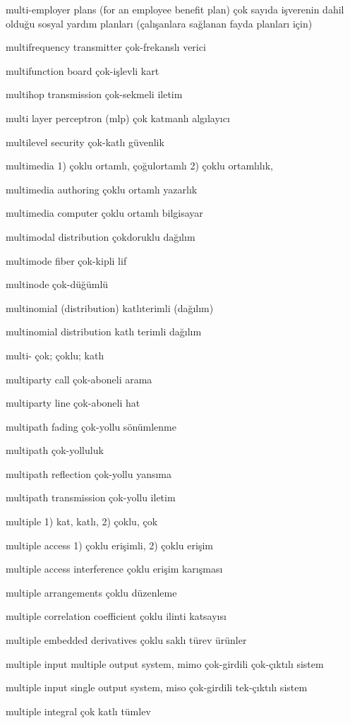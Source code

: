 \documentclass[12pt,fleqn]{article}\usepackage{../../common}
\begin{document}
multi-employer plans (for an employee benefit plan) çok sayıda işverenin dahil olduğu sosyal yardım planları (çalışanlara sağlanan fayda planları için)

multifrequency transmitter çok-frekanslı verici

multifunction board çok-işlevli kart

multihop transmission çok-sekmeli iletim

multi layer perceptron (mlp) çok katmanlı algılayıcı

multilevel security çok-katlı güvenlik

multimedia 1) çoklu ortamlı, çoğulortamlı 2) çoklu ortamlılık,

multimedia authoring çoklu ortamlı yazarlık

multimedia computer çoklu ortamlı bilgisayar

multimodal distribution çokdoruklu dağılım

multimode fiber çok-kipli lif

multinode çok-düğümlü

multinomial (distribution) katlıterimli (dağılım)

multinomial distribution katlı terimli dağılım

multi- çok; çoklu; katlı

multiparty call çok-aboneli arama

multiparty line çok-aboneli hat

multipath fading çok-yollu sönümlenme

multipath çok-yolluluk

multipath reflection çok-yollu yansıma

multipath transmission çok-yollu iletim

multiple 1) kat, katlı, 2) çoklu, çok

multiple access 1) çoklu erişimli, 2) çoklu erişim

multiple access interference çoklu erişim karışması

multiple arrangements çoklu düzenleme

multiple correlation coefficient çoklu ilinti katsayısı

multiple embedded derivatives çoklu saklı türev ürünler

multiple input multiple output system, mimo çok-girdili çok-çıktılı sistem

multiple input single output system, miso çok-girdili tek-çıktılı sistem

multiple integral çok katlı tümlev
\end{document}
